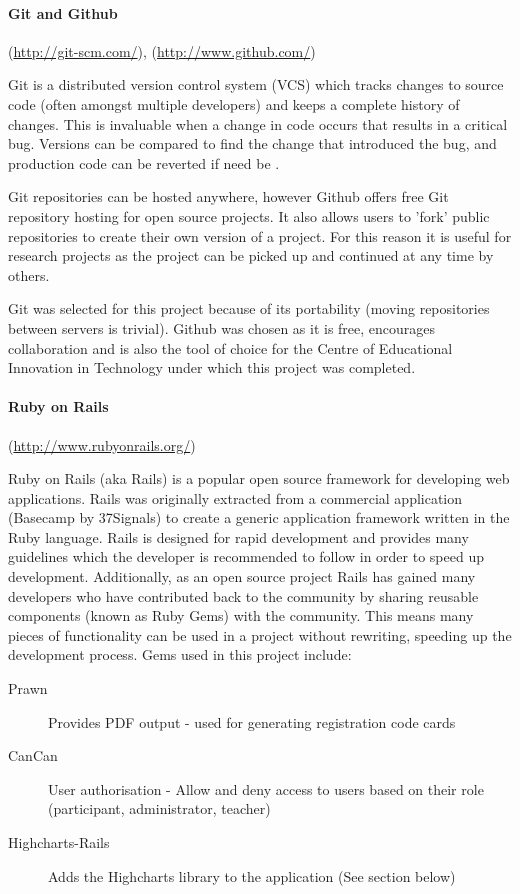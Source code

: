 \paragraph{Git and Github}
(\url{http://git-scm.com/}),
(\url{http://www.github.com/})

Git is a distributed version control system (VCS) which tracks changes
to source code (often amongst multiple developers) and keeps a complete history
of changes. This is invaluable when a change in code occurs that results in a critical
bug. Versions can be compared to find the change that introduced the bug, and production
code can be reverted if need be \cite{scott_chacon_pro_2009}.

Git repositories can be hosted anywhere, however Github offers free Git repository hosting
for open source projects. It also allows
users to 'fork' public repositories to create their own version of a project. For this
reason it is useful for research projects as the project can be picked up and continued
at any time by others.

Git was selected for this project because of its portability (moving repositories
between servers is trivial). Github was chosen as it is free, encourages collaboration and is also the tool of choice for the 
Centre of Educational Innovation in Technology \cite{zornig_ceit_2012} under which this project was completed. 

\paragraph{Ruby on Rails}
(\url{http://www.rubyonrails.org/})

Ruby on Rails (aka Rails) is a popular open source framework for developing web applications\cite{bachle_ruby_2007}.
Rails was originally extracted from a commercial application (Basecamp by 37Signals) to create a generic
application framework \cite{carneiro_jr._beginning_2010} written in the Ruby language. Rails is designed for
rapid development and provides many guidelines which the developer is recommended to follow in order to speed up
development. Additionally, as an open source project Rails has gained many developers who have contributed back
to the community by sharing reusable components (known as Ruby Gems) with the community. This means many pieces of
functionality can be used in a project without rewriting, speeding up the development process. Gems used in this
project include:
\begin{description}
\item[Prawn] Provides PDF output - used for generating registration code cards
\item[CanCan] User authorisation - Allow and deny access to users based on their role (participant, administrator, teacher)
\item[Highcharts-Rails] Adds the Highcharts library to the application (See section below)
\end{description}

